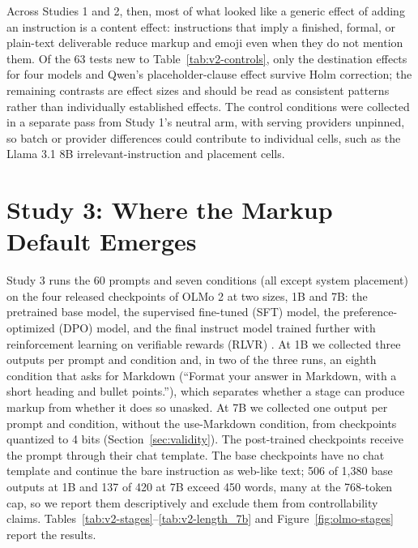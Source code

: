 \documentclass[acmsmall,screen,review,anonymous]{acmart}
\begin{document}
Across Studies 1 and 2, then, most of what looked like a generic effect of adding an instruction is a content effect: instructions that imply a finished, formal, or plain-text deliverable reduce markup and emoji even when they do not mention them. Of the 63 tests new to Table~\ref{tab:v2-controls}, only the destination effects for four models and Qwen's placeholder-clause effect survive Holm correction; the remaining contrasts are effect sizes and should be read as consistent patterns rather than individually established effects. The control conditions were collected in a separate pass from Study 1's neutral arm, with serving providers unpinned, so batch or provider differences could contribute to individual cells, such as the Llama 3.1 8B irrelevant-instruction and placement cells.

\section{Study 3: Where the Markup Default Emerges}
\label{sec:study3}

Study 3 runs the 60 prompts and seven conditions (all except system placement) on the four released checkpoints of OLMo 2 at two sizes, 1B and 7B: the pretrained base model, the supervised fine-tuned (SFT) model, the preference-optimized (DPO) model, and the final instruct model trained further with reinforcement learning on verifiable rewards (RLVR) \cite{olmo2025furious,lambert2024tulu}. At 1B we collected three outputs per prompt and condition and, in two of the three runs, an eighth condition that asks for Markdown (``Format your answer in Markdown, with a short heading and bullet points.''), which separates whether a stage can produce markup from whether it does so unasked. At 7B we collected one output per prompt and condition, without the use-Markdown condition, from checkpoints quantized to 4 bits (Section~\ref{sec:validity}). The post-trained checkpoints receive the prompt through their chat template. The base checkpoints have no chat template and continue the bare instruction as web-like text; 506 of 1,380 base outputs at 1B and 137 of 420 at 7B exceed 450 words, many at the 768-token cap, so we report them descriptively and exclude them from controllability claims. Tables~\ref{tab:v2-stages}--\ref{tab:v2-length_7b} and Figure~\ref{fig:olmo-stages} report the results.




\end{document}
